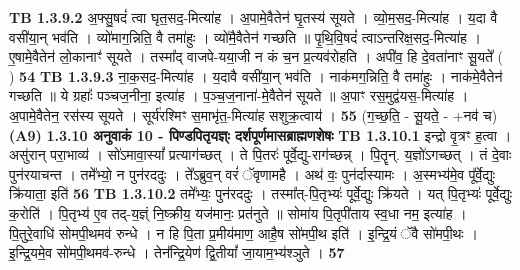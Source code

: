 \documentclass[17pt]{extarticle}
\begin{document}
                  \newline
                                \textbf{ TB 1.3.9.2} \newline
                  अ॒फ्सु॒षदं॑ त्वा घृत॒सद॒-मित्या॑ह । अ॒पामे॒वैतेन॑ घृ॒तस्य॑ सूयते । व्यो॒म॒सद॒-मित्या॑ह । य॒दा वै वसी॑या॒न् भव॑ति । व्यो॑माग॒न्निति॒ वै तमा॑हुः । व्यो॑मै॒वैतेन॑ गच्छति ॥ पृ॒थि॒वि॒षदं॑ त्वाऽन्तरिक्ष॒सद॒-मित्या॑ह । ए॒षामे॒वैतेन॑ लो॒कानाꣳ॑ सूयते । तस्मा᳚द् वाजपे-यया॒जी न कं च॒न प्र॒त्यव॑रोहति । अपी॑व॒ हि दे॒वता॑नाꣳ सू॒यते᳚ ( ) \textbf{ 54} \newline
                  \newline
                                \textbf{ TB 1.3.9.3} \newline
                  ना॒क॒सद॒-मित्या॑ह । य॒दावै वसी॑या॒न् भव॑ति । नाक॑मग॒न्निति॒ वै तमा॑हुः । नाक॑मे॒वैतेन॑ गच्छति ॥ ये ग्रहाः᳚ पञ्चज॒नीना॒ इत्या॑ह । प॒ञ्च॒ज॒नाना॑-मे॒वैतेन॑ सूयते ॥ अ॒पाꣳ रस॒मुद्व॑यस॒-मित्या॑ह । अ॒पामे॒वैतेन॒ रस॑स्य सूयते । सूर्य॑रश्मिꣳ स॒माभृ॑त॒-मित्या॑ह सशुक्र॒त्वाय॑ । \textbf{ 55} \newline
                  \newline
                                    (ग॒च्छ॒ति॒ - सू॒यते॒ - +नव॑ च) \textbf{(A9)} \newline \newline
                \textbf{ 1.3.10    अनुवाकं   10 - पिण्डपितृयज्ञ्ः दर्शपूर्णमासब्राह्मणशेषः} \newline
                                \textbf{ TB 1.3.10.1} \newline
                  इन्द्रो वृ॒त्रꣳ ह॒त्वा । असु॑रान् परा॒भाव्य॑ । सो॑ऽमावा॒स्यां᳚ प्रत्याग॑च्छत् । ते पि॒तरः॑ पूर्वे॒द्यु-राग॑च्छन्न् । पि॒तॄन्. य॒ज्ञो॑ऽगच्छत् । तं दे॒वाः पुन॑रयाचन्त । तमे᳚भ्यो॒ न पुन॑रददुः । ते᳚ऽब्रुव॒न् वरं॑ ॅवृणामहै । अथ॑ वः॒ पुन॑र्दास्यामः । अ॒स्मभ्य॑मे॒व पू᳚र्वे॒द्युः क्रि॑याता॒ इति॑ \textbf{ 56} \newline
                  \newline
                                \textbf{ TB 1.3.10.2} \newline
                  तमे᳚भ्यः॒ पुन॑रददुः । तस्मा᳚त्-पि॒तृभ्यः॑ पूर्वे॒द्युः क्रि॑यते । यत् पि॒तृभ्यः॑ पूर्वे॒द्युः क॒रोति॑ । पि॒तृभ्य॑ ए॒व तद्-य॒ज्ञ्ं नि॒ष्क्रीय॒ यज॑मानः॒ प्रत॑नुते ॥ सोमा॑य पि॒तृपी॑ताय स्व॒धा नम॒ इत्या॑ह । पि॒तुरे॒वाधि॑ सोमपी॒थमव॑ रुन्धे । न हि पि॒ता प्र॒मीय॑माण॒ आहै॒ष सो॑मपी॒थ इति॑ । इ॒न्द्रि॒यं ॅवै सो॑मपी॒थः । इ॒न्द्रि॒यमे॒व सो॑मपी॒थमव॑-रुन्धे । तेन᳚न्द्रि॒येण॑ द्वि॒तीयां᳚ जा॒याम॒भ्य॑श्ञुते । \textbf{ 57} \newline
                  \newline
\end{document}
